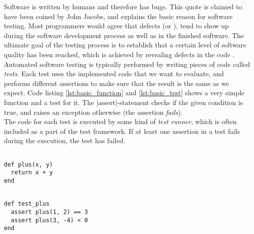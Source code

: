 \MakeShortVerb{\|}

Software is written by humans and therefore has bugs. This quote is
claimed to have been coined by John Jacobs\cite{web:quote_jacobs}, and
explains the basic reason for software testing. Most programmers would
agree that defects (or ), tend to show up
during the software development process as well as in the finished
software. The ultimate goal of the testing process is to establish that
a certain level of software quality has been reached, which is achieved
by revealing defects in the code \cite{book:adp}.\\

Automated software testing is typically performed by writing pieces of
code called \emph{tests}. Each test uses the implemented code that we
want to evaluate, and performs different assertions to make sure that
the result is the same as we expect. Code listing
\ref{lst:basic_function} and \ref{lst:basic_test} shows a very simple
function and a test for it. The |assert|-statement checks if the given
condition is true, and raises an exception otherwise (the assertion
\emph{fails}).\\

The code for each test is executed by some kind of \emph{test runner},
which is often included as a part of the test framework. If at least one
assertion in a test fails during the execution, the test has failed.\\


\begin{lstlisting}[caption=An example function.,
                   label=lst:basic_function, float=t]

def plus(x, y)
  return x + y
end

\end{lstlisting}


\begin{lstlisting}[caption=A basic test for the function in code listing \ref{lst:basic_function}.,
                   label=lst:basic_test, float=t]

def test_plus
  assert plus(1, 2) == 3
  assert plus(3, -4) < 0
end

\end{lstlisting}
